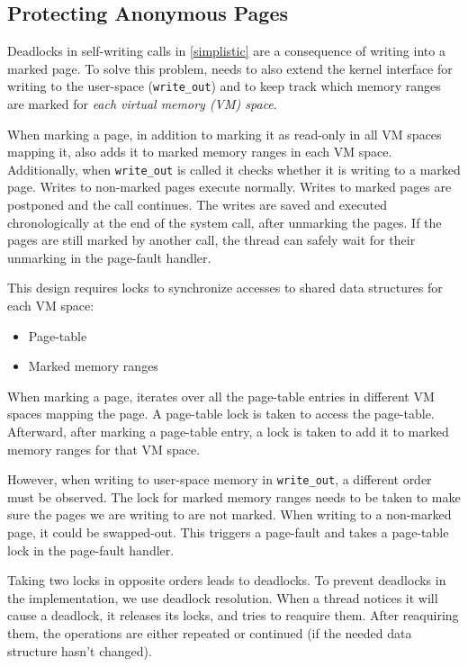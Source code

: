 \subsection{Protecting Anonymous Pages}
\label{subsec:complex}

Deadlocks in self-writing calls in \autoref{simplistic} are a consequence of
writing into a marked page. To solve this problem, \sysname needs to also extend
the kernel interface for writing to the user-space (\texttt{write\_out}) and to
keep track which memory ranges are marked for \emph{each virtual memory (VM) space}.

When marking a page, in addition to marking it as read-only in all VM spaces
mapping it, \sysname also adds it to marked memory ranges in each VM space.
Additionally, when \texttt{write\_out} is called it checks whether it is writing
to a marked page. Writes to non-marked pages execute normally. Writes to marked
pages are postponed and the call continues. The writes are saved and executed
chronologically at the end of the system call, after unmarking the pages. If the
pages are still marked by another call, the thread can safely wait for their
unmarking in the page-fault handler.

This design requires locks to synchronize accesses to shared data structures for each VM space:
\begin{itemize}
  \item Page-table
  \item Marked memory ranges
\end{itemize}

When marking a page, \sysname iterates over all the page-table entries in different
VM spaces mapping the page. A page-table lock is taken to access the page-table.
Afterward, after marking a page-table entry, a lock is taken to add it
to marked memory ranges for that VM space.

However, when writing to user-space memory in \texttt{write\_out}, a different 
order must be observed. The lock for marked memory ranges needs to be taken to
make sure the pages we are writing to are not marked. When writing to a non-marked
page, it could be swapped-out. This triggers a page-fault and takes a page-table lock
in the page-fault handler.

Taking two locks in opposite orders leads to deadlocks. To prevent deadlocks
in the \sysname implementation, we use deadlock resolution. When a thread notices
it will cause a deadlock, it releases its locks, and tries to reaquire them.
After reaquiring them, the operations are either repeated or continued (if the
needed data structure hasn't changed).

